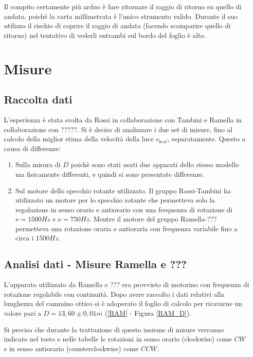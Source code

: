 \documentclass{article}
\begin{document}
Il compito certamente più arduo è fare ritornare il raggio di ritorno su quello di andata, poichè la carta millimetrata è l'unico strumento valido. Durante il suo utilizzo
il rischio di coprire il raggio di andata (facendo scomparire quello di ritorno) nel tentativo di vederli entrambi sul bordo del foglio è alto.


\section{Misure}

\subsection{Raccolta dati}
L'esperienza è stata svolta da Rossi in collaborazione con Tambini e Ramella in collaborazione con ?????. Si è deciso di analizzare i due set di misure, fino al calcolo 
della miglior stima della velocità della luce $c_{best}$, separatamente. Questo a causa di differenze:

\begin{enumerate}
    \item Sulla misura di $D$ poichè sono stati usati due apparati dello stesso modello ma fisicamente differenti, e quindi si sono presentate differenze.
    \item Sul motore dello specchio rotante utilizzato. Il gruppo Rossi-Tambini ha utilizzato un motore per lo specchio rotante che permetteva solo la regolazione in 
            senso orario e antiorario con una frequenza di rotazione di $\nu = 1500 Hz$ e $\nu = 750 Hz$. Mentre il motore del gruppo Ramella-??? permetteva una rotazione
            oraria e antioraria con frequenza variabile fino a circa i $1500 Hz$.
\end{enumerate}

\subsection{Analisi dati - Misure Ramella e ???}

L'apparato utilizzato da Ramella e ??? era provvisto di motorino con frequenza di rotazione regolabile con continuità. Dopo avere raccolto i dati relativi alla 
lunghezza del cammino ottico si è adoperato il foglio di calcolo per ricavarne un valore pari a $D = 13,60 \pm 0,01 m$ (\ref{RAM} - Figura \ref{RAM_D}).

Si precisa che durante la trattazione di questo insieme di misure verranno indicate nel testo e nelle tabelle le rotazioni in senso orario (clockwise) come $CW$ e
in senso antiorario (counterclockwise) come $CCW$.
\end{document}
